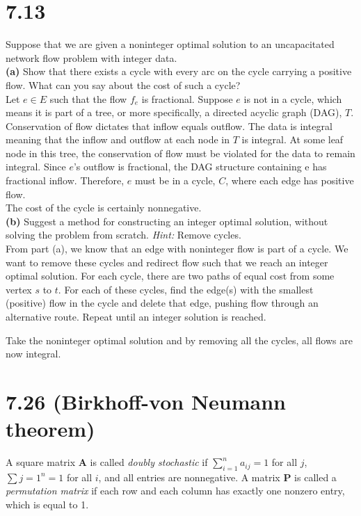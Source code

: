 \documentclass{article}
\begin{document}
\section*{7.13}
Suppose that we are given a noninteger optimal solution to an uncapacitated network flow problem with integer data. \\

\noindent \textbf{(a)}  Show that there exists a cycle with every arc on the cycle carrying a positive flow.  What can you say about the cost of such a cycle? \\

\noindent
Let $e \in E$ such that the flow $f_{e}$ is fractional.  Suppose $e$ is not in a cycle, which means it is part of a tree, or more specifically, a directed acyclic graph (DAG), $T$.  Conservation of flow dictates that inflow equals outflow.  The data is integral meaning that the inflow and outflow at each node in $T$ is integral.  At some leaf node in this tree, the conservation of flow must be violated for the data to remain integral.  Since $e$'s outflow is fractional, the DAG structure containing e has fractional inflow.  Therefore, $e$ must be in a cycle, $C$, where each edge has positive flow.\\

\noindent
The cost of the cycle is certainly nonnegative.  \\

\noindent \textbf{(b)}  Suggest a method for constructing an integer optimal solution, without solving the problem from scratch.  \emph{Hint:}  Remove cycles. \\

From part (a), we know that an edge with noninteger flow is part of a cycle.  We want to remove these cycles and redirect flow such that we reach an integer optimal solution.  For each cycle, there are two paths of equal cost from some vertex $s$ to $t$.  For each of these cycles, find the edge(s) with the smallest (positive) flow in the cycle and delete that edge, pushing flow through an alternative route.  Repeat until an integer solution is reached.  

\noindent
Take the noninteger optimal solution and by removing all the cycles, all flows are now integral.

\section*{7.26 (Birkhoff-von Neumann theorem)}
A square matrix $\mathbf{A}$ is called \emph{doubly stochastic} if $\sum_{i=1}^n a_{ij} = 1$ for all $j$, $\sum{j=1}^n = 1$ for all $i$, and all entries are nonnegative.  A matrix $\mathbf{P}$ is called a \emph{permutation matrix} if each row and each column has exactly one nonzero entry, which is equal to 1. \\
\end{document}
